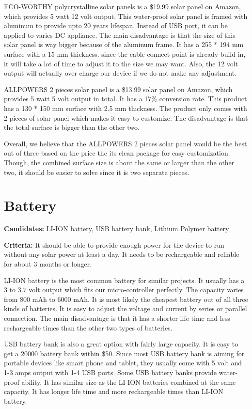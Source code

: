 \documentclass[IEEEtran,letterpaper,10pt,titlepage,fleqn,draftclsnofoot,onecolumn]{article}
\begin{document}
ECO-WORTHY polycrystalline solar panels\cite{ECO-WORTHY} is a \$19.99 solar panel on Amazon, which provides 5 watt 12 volt output. This water-proof solar panel is framed with aluminum to provide upto 20 years lifespan. Instead of USB port, it can be applied to varies DC appliance. The main disadvantage is that the size of this solar panel is way bigger because of the aluminum frame. It has a 255 * 194 mm surface with a 15 mm thickness. since the cable connect point is already build-in, it will take a lot of time to adjust it to the size we may want. Also, the 12 volt output will actually over charge our device if we do not make any adjustment. 

ALLPOWERS 2 pieces solar panel\cite{ALLPOWERS} is a \$13.99 solar panel on Amazon, which provides 5 watt 5 volt output in total. It has a 17\% conversion rate. This product has a 130 * 150 mm surface with 2.5 mm thickness. The product only comes with 2 pieces of solar panel which makes it easy to customize. The disadvantage is that the total surface is bigger than the other two. 

Overall, we believe that the ALLPOWERS 2 pieces solar panel would be the best out of three based on the price the its clean package for easy customization. Though, the combined surface size is about the same or larger than the other two, it should be easier to solve since it is two separate pieces.


\section{Battery}
\textbf{Candidates:} LI-ION battery, USB battery bank, Lithium Polymer battery

\textbf{Criteria:} It should be able to provide enough power for the device to run without any solar power at least a day. It needs to be rechargeable and reliable for about 3 months or longer. 

LI-ION\cite{liion_vs_lipo} battery is the most common battery for similar projects. It usually has a 3 to 3.7 volt output which fits our micro-controller perfectly. The capacity varies from 800 mAh to 6000 mAh. It is most likely the cheapest battery out of all three kinds of batteries. It is easy to adjust the voltage and current by series or parallel connection. The main disadvantage is that it has a shorter life time and less rechargeable times than the other two types of batteries.

USB battery bank is also a great option with fairly large capacity. It is easy to get a 20000 battery bank within \$50. Since most USB battery bank is aiming for portable devices like smart phone and tablet, they usually come with 5 volt and 1-3 amps output with 1-4 USB ports. Some USB battery banks provide water-proof ability. It has similar size as the LI-ION batteries combined at the same capacity. It has longer life time and more rechargeable times than LI-ION battery.
\end{document}
